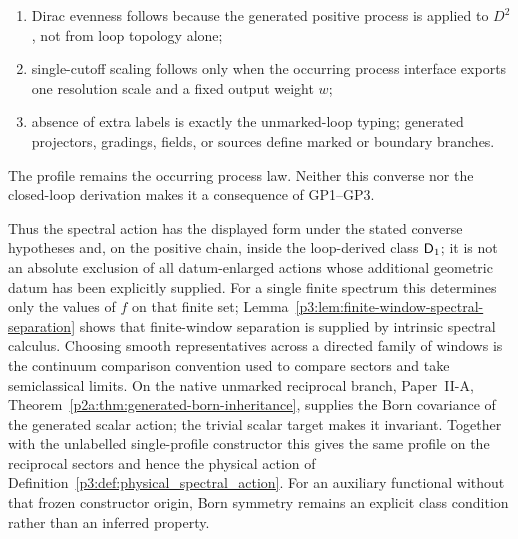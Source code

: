 \documentclass[12pt,a4paper]{article}
\begin{document}
\begin{theorem}
\begin{remark}
\begin{enumerate}[label=(\roman*),leftmargin=2.1em]
\item Dirac evenness follows because the generated positive process is applied
to \(D^2\), not from loop topology alone;
\item single-cutoff scaling follows only when the occurring process interface
exports one resolution scale and a fixed output weight \(w\);
\item absence of extra labels is exactly the unmarked-loop typing; generated
projectors, gradings, fields, or sources define marked or boundary branches.
\end{enumerate}
The profile remains the occurring process law.  Neither this converse nor the
closed-loop derivation makes it a consequence of GP1--GP3.
\end{remark}

Thus the spectral action has the displayed form under the stated converse
hypotheses and, on the positive chain, inside the loop-derived class \(\mathsf{D}_1\); it is not an
absolute exclusion of all datum-enlarged actions whose additional geometric datum has been explicitly supplied.  For a single finite spectrum this determines only the values of \(f\) on that finite set; Lemma~\ref{p3:lem:finite-window-spectral-separation} shows that finite-window separation is supplied by intrinsic spectral calculus.  Choosing smooth representatives across a directed family of windows is the continuum comparison convention used to compare sectors and take semiclassical limits.
On the native unmarked reciprocal branch, Paper~II-A,
Theorem~\ref{p2a:thm:generated-born-inheritance}, supplies the Born covariance
of the generated scalar action; the trivial scalar target makes it invariant.
Together with the unlabelled single-profile constructor this gives the same
profile on the reciprocal sectors and hence the physical action of
Definition~\ref{p3:def:physical_spectral_action}.  For an auxiliary functional
without that frozen constructor origin, Born symmetry remains an explicit
class condition rather than an inferred property.
\end{theorem}
\end{document}
